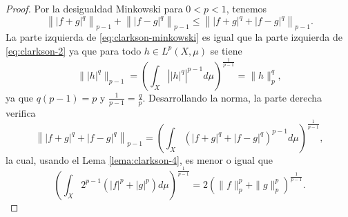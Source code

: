 \Clarksonii
\begin{proof}
    Por la desigualdad Minkowski para $ 0 < p < 1 $, tenemos 
    \begin{equation} \label{eq:clarkson-minkowski}
        \left\| \left| f + g \right|^q \right\|_{p-1} + \left\| \left| f - g \right|^q \right\|_{p-1} \leq \left\| \left| f + g \right|^q + \left| f - g \right|^q \right\|_{p-1}.
    \end{equation}
    La parte izquierda de \eqref{eq:clarkson-minkowski} es igual que la parte izquierda de \eqref{eq:clarkson-2} ya que para todo $ h \in L^p(X, \mu) $ se tiene
    \begin{equation}
        \| | h |^q \|_{p-1} = \left( \int_{X} \left| |h|^q \right|^{p-1} d \mu \right)^{\frac{1}{p-1}} = \|h\|_p^q,
    \end{equation}
    ya que $ q (p-1) = p $ y $ \frac{1}{p-1} = \frac{q}{p} $. Desarrollando la norma, la parte derecha verifica
    \begin{equation}
        \left\| \left| f + g \right|^q + \left| f - g \right|^q \right\|_{p-1} = \left( \int_X \left( \left| f + g \right|^q + \left| f - g \right|^q \right)^{p-1} d \mu \right)^\frac{1}{{p-1}},
    \end{equation}
    la cual, usando el Lema \ref{lema:clarkson-4}, es menor o igual que
    \begin{equation}
        \left( \int_X 2^{p-1}( \left| f \right|^p + \left| g \right|^p)  d \mu \right)^\frac{1}{{p-1}} = 2 \left(\|f \|_p^p + \|g\|_p^p \right)^{\frac{1}{p-1}}.
    \end{equation}
\end{proof}

